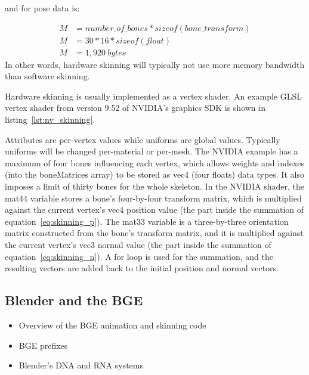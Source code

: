 and for pose data is:

\begin{align*}
 M &= number\_of\_bones*sizeof(bone\_transform)\\
 M &= 30 * 16 * sizeof(float)\\
 M &= 1,920\ bytes
\end{align*}
In other words, hardware skinning will typically not use more memory bandwidth than software skinning.

Hardware skinning is usually implemented as a vertex shader.
An example GLSL vertex shader from version 9.52 of NVIDIA's graphics SDK\cite{nvidiasdk} is shown in listing~\ref{lst:nv_skinning}.


Attributes are per-vertex values while uniforms are global values.
Typically uniforms will be changed per-material or per-mesh.
The NVIDIA example has a maximum of four bones influencing each vertex, which allows weights and indexes (into the boneMatrices array) to be stored as vec4 (four floats) data types.
It also imposes a limit of thirty bones for the whole skeleton.
In the NVIDIA shader, the mat44 variable stores a bone's four-by-four transform matrix, which is multiplied against the current vertex's vec4 position value (the part inside the summation of equation~\ref{eq:skinning_p}).
The mat33 variable is a three-by-three orientation matrix constructed from the bone's transform matrix, and it is multiplied against the current vertex's vec3 normal value (the part inside the summation of equation~\ref{eq:skinning_n}).
A for loop is used for the summation, and the resulting vectors are added back to the initial position and normal vectors.

\subsection{Blender and the BGE}
\ifsummaries
\begin{itemize}
 \item Overview of the BGE animation and skinning code
 \item BGE prefixes
 \item Blender's DNA and RNA systems
\end{itemize}
\fi

